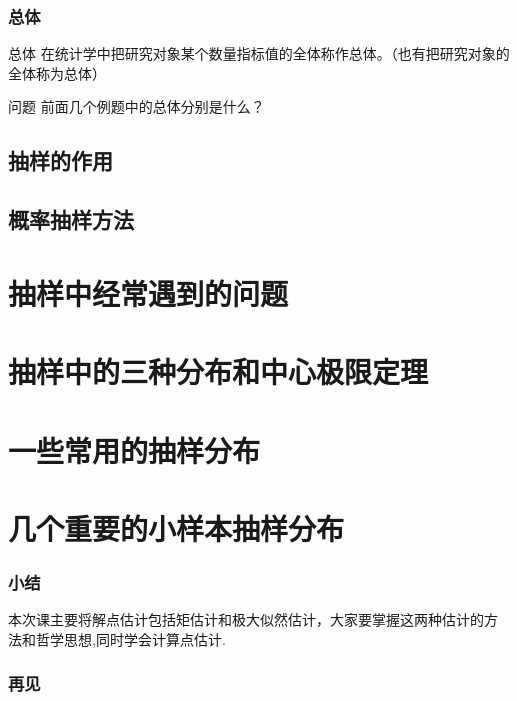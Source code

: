 \documentclass[10pt,xcolor=dvipsnames,hyperref={CJKbookmarks=true}]{beamer}
\begin{document}
\begin{frame}[c]
  \frametitle{总体}
  \begin{block}{总体}
    在统计学中把研究对象某个数量指标值的全体称作总体。（也有把研究对象的全体称为总体）
  \end{block}
  \begin{alertblock}{问题}
 前面几个例题中的总体分别是什么？    
  \end{alertblock}
\end{frame}




\subsection{抽样的作用}


\subsection{概率抽样方法}

\section{抽样中经常遇到的问题}


\section{抽样中的三种分布和中心极限定理}
\label{sec:three_distribution}

\section{一些常用的抽样分布}
\label{sec:normal_sample_distribution}

\section{几个重要的小样本抽样分布}
\label{sec:small_sample_distribution}








\begin{frame}
  \frametitle{小结}
本次课主要将解点估计包括矩估计和极大似然估计，大家要掌握这两种估计的方
法和哲学思想,同时学会计算点估计.
\end{frame}

\begin{frame}
  \frametitle{再见}
  
\end{frame}
\end{document}
